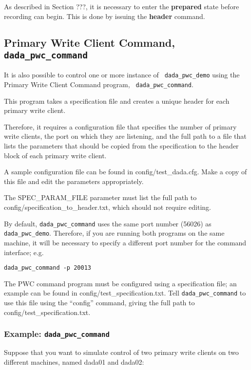 As described in Section ???, it is necessary to enter the 
{\bf prepared} state before recording can begin.  This is done by issuing
the {\bf header} command.

\subsection{Primary Write Client Command, {\tt dada\_pwc\_command}}

It is also possible to control one or more instance of {\tt
dada\_pwc\_demo} using the Primary Write Client Command program, {\tt
dada\_pwc\_command}. 

This program takes a specification file and creates a unique header
for each primary write client.

Therefore, it requires a configuration file that specifies the number
of primary write clients, the port on which they are listening, and
the full path to a file that lists the parameters that should be
copied from the specification to the header block of each primary
write client.

A sample configuration file can be found in config/test_dada.cfg.
Make a copy of this file and edit the parameters appropriately.

The SPEC_PARAM_FILE parameter must list the full path to
config/specification_to_header.txt, which should not require editing.

By default, {\tt dada\_pwc\_command} uses the same port number (56026)
as {\tt dada\_pwc\_demo}.  Therefore, if you are running both programs
on the same machine, it will be necessary to specify a different port
number for the command interface; e.g.
\begin{verbatim}
dada_pwc_command -p 20013
\end{verbatim}

The PWC command program must be configured using a specification file;
an example can be found in config/test_specification.txt.  Tell
{\tt dada\_pwc\_command} to use this file using the ``config'' command,
giving the full path to config/test_specification.txt.

\subsubsection{Example: {\tt dada\_pwc\_command}}

Suppose that you want to simulate control of two primary write clients
on two different machines, named dada01 and dada02:

